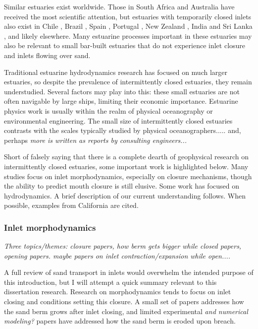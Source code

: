 Similar estuaries exist worldwide. Those in South Africa \parencite{cooper_geomorphological_2001} and Australia \parencite{roy_structure_2001} have received the most scientific attention, but estuaries with temporarily closed inlets also exist in Chile \parencite{dussaillant_water_2009}, Brazil \parencite{suzuki_effects_1998}, Spain \parencite{moreno_morphodynamics_2010}, Portugal \parencite{fortunato_morphological_2014}, New Zealand \parencite{schallenberg_contrasting_2010}, India and Sri Lanka \parencite{ranasinghe_seasonal_2003}, and likely elsewhere. Many estuarine processes important in these estuaries may also be relevant to small bar-built estuaries that do not experience inlet closure and inlets flowing over sand. 

Traditional estuarine hydrodynamics research has focused on much larger estuaries, so despite the prevalence of intermittently closed estuaries, they remain understudied.  Several factors may play into this: these small estuaries are not often navigable by large ships, limiting their economic importance. Estuarine physics work is usually within the realm of physical oceanography or environmental engineering. The small size of intermittently closed estuaries contrasts with the scales typically studied by physical oceanographers..... and, perhaps \emph{more is written as reports by consulting engineers...}

Short of falsely saying that there is a complete dearth of geophysical research on intermittently closed estuaries, some important work is highlighted below. Many studies focus on inlet morphodynamics, especially on closure mechanisms, though the ability to predict mouth closure is still elusive. Some work has focused on hydrodynamics. A brief description of our current understanding follows. When possible, examples from California are cited.

\subsubsection{Inlet morphodynamics}
\emph{Three topics/themes: closure papers, how berm gets bigger while closed papers, opening papers. maybe papers on inlet contraction/expansion while open....}


A full review of sand transport in inlets would overwhelm the intended purpose of this introduction, but I will attempt a quick summary relevant to this dissertation research. Research on morphodynamics tends to focus on inlet closing and conditions setting this closure. A small set of papers addresses how the sand berm grows after inlet closing, and limited experimental \emph{and numerical modeling?} papers have addressed how the sand berm is eroded upon breach.

